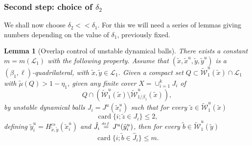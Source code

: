 \documentclass[a4paper,11pt,reqno]{amsart}
\newcommand{\cL}{{\mathcal L}}
\newcommand{\cW}{{\mathcal W}}
\newcommand{\card}{\operatorname{card}}
\newcommand{\eqdef}{\stackrel{\scriptscriptstyle\textrm def.}{=}}
\newcommand{\tix}{\tilde{x}}
\newcommand{\tm}{\tilde{\mu}}
\newtheorem{lemma}[theorem]{Lemma}
\theoremstyle{definition}
\begin{document}
\subsubsection{Second step: choice of $\delta_2$} 
We shall now choose $\delta_2<<\delta_1$. For this we will need a series of lemmas giving numbers depending on the value of $\delta_1$, previously fixed. 
\begin{lemma}[Overlap control of unstable dynamical balls]
\label{lem:overlapcontrol}
There exists a constant $m=m(\cL_1)$ with the following property. Assume that $(\tix,\tix^u,\tilde{y},\tilde{y}^u)$ is a $(\beta_1,\ell)$-quadrilateral, with $\tix,\tilde{y}\in\cL_1$. Given a compact set $Q\subset\widetilde{\cW}^u_1(\tix)\cap\cL_1$ with $\tm(Q)>1-\eta_1$, given any finite cover $X=\cup_{i=1}^kJ_i$ of 
\[
Q\cap\left(\widetilde{\cW}^u_1(\tix)\setminus\widetilde{\cW}^u_{1/\beta_1}(\tix)\right),
\]
by unstable dynamical balls $J_i=J^u(\tix^u_i)$ such that for every $\tilde{z}\in\widetilde{\cW}^u_1(\tix)$
\[
\card\{i;\tilde{z}\in J_i\}\leq 2,
\]
defining $\tilde{y}^u_i=H^{cs}_{\tix,\tilde{y}}(\tix^u_i)$ and $\hat{J}_i\eqdef J^u(\tilde{y}^u_i)$, then for every $\tilde{b}\in\widetilde{\cW}^u_1(\tilde{y})$
\[
\card\{i;\tilde{b}\in\hat{J}_i\}\leq m.
\]
\end{lemma}
\end{document}
